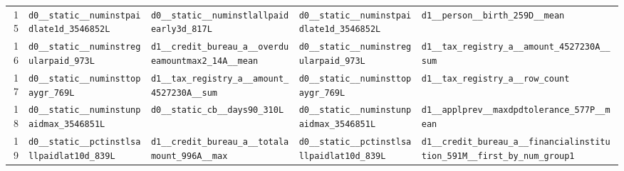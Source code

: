 \documentclass[final,5p,twocolumn]{elsarticle}
\begin{document}
\begin{table}[htbp]
\begin{threeparttable}
\begin{tabular}{@{}rL{40mm}L{40mm}L{40mm}L{40mm}@{}}
15 & \texttt{d0\_\allowbreak \_\allowbreak static\_\allowbreak \_\allowbreak numinstpaidlate1d\_\allowbreak 3546852L} & \texttt{d0\_\allowbreak \_\allowbreak static\_\allowbreak \_\allowbreak numinstlallpaidearly3d\_\allowbreak 817L} & \texttt{d0\_\allowbreak \_\allowbreak static\_\allowbreak \_\allowbreak numinstpaidlate1d\_\allowbreak 3546852L} & \texttt{d1\_\allowbreak \_\allowbreak person\_\allowbreak \_\allowbreak birth\_\allowbreak 259D\_\allowbreak \_\allowbreak mean} \\
16 & \texttt{d0\_\allowbreak \_\allowbreak static\_\allowbreak \_\allowbreak numinstregularpaid\_\allowbreak 973L} & \texttt{d1\_\allowbreak \_\allowbreak credit\_\allowbreak bureau\_\allowbreak a\_\allowbreak \_\allowbreak overdueamountmax2\_\allowbreak 14A\_\allowbreak \_\allowbreak mean} & \texttt{d0\_\allowbreak \_\allowbreak static\_\allowbreak \_\allowbreak numinstregularpaid\_\allowbreak 973L} & \texttt{d1\_\allowbreak \_\allowbreak tax\_\allowbreak registry\_\allowbreak a\_\allowbreak \_\allowbreak amount\_\allowbreak 4527230A\_\allowbreak \_\allowbreak sum} \\
17 & \texttt{d0\_\allowbreak \_\allowbreak static\_\allowbreak \_\allowbreak numinsttopaygr\_\allowbreak 769L} & \texttt{d1\_\allowbreak \_\allowbreak tax\_\allowbreak registry\_\allowbreak a\_\allowbreak \_\allowbreak amount\_\allowbreak 4527230A\_\allowbreak \_\allowbreak sum} & \texttt{d0\_\allowbreak \_\allowbreak static\_\allowbreak \_\allowbreak numinsttopaygr\_\allowbreak 769L} & \texttt{d1\_\allowbreak \_\allowbreak tax\_\allowbreak registry\_\allowbreak a\_\allowbreak \_\allowbreak row\_\allowbreak count} \\
18 & \texttt{d0\_\allowbreak \_\allowbreak static\_\allowbreak \_\allowbreak numinstunpaidmax\_\allowbreak 3546851L} & \texttt{d0\_\allowbreak \_\allowbreak static\_\allowbreak cb\_\allowbreak \_\allowbreak days90\_\allowbreak 310L} & \texttt{d0\_\allowbreak \_\allowbreak static\_\allowbreak \_\allowbreak numinstunpaidmax\_\allowbreak 3546851L} & \texttt{d1\_\allowbreak \_\allowbreak applprev\_\allowbreak \_\allowbreak maxdpdtolerance\_\allowbreak 577P\_\allowbreak \_\allowbreak mean} \\
19 & \texttt{d0\_\allowbreak \_\allowbreak static\_\allowbreak \_\allowbreak pctinstlsallpaidlat10d\_\allowbreak 839L} & \texttt{d1\_\allowbreak \_\allowbreak credit\_\allowbreak bureau\_\allowbreak a\_\allowbreak \_\allowbreak totalamount\_\allowbreak 996A\_\allowbreak \_\allowbreak max} & \texttt{d0\_\allowbreak \_\allowbreak static\_\allowbreak \_\allowbreak pctinstlsallpaidlat10d\_\allowbreak 839L} & \texttt{d1\_\allowbreak \_\allowbreak credit\_\allowbreak bureau\_\allowbreak a\_\allowbreak \_\allowbreak financialinstitution\_\allowbreak 591M\_\allowbreak \_\allowbreak first\_\allowbreak by\_\allowbreak num\_\allowbreak group1} \\

\end{tabular}
\end{threeparttable}
\end{table}
\end{document}
